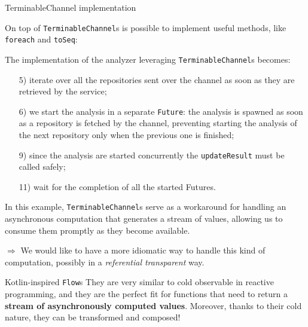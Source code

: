 \documentclass[aspectratio=1610,xcolor=dvipsnames]{beamer}
\begin{document}
%
\begin{frame}{TerminableChannel implementation}
  
\end{frame}
%
\begin{frame}
  
\end{frame}
%
\begin{frame}
  \small
  On top of \texttt{TerminableChannel}s is possible to implement useful methods, like \texttt{foreach} and \texttt{toSeq}:
  
\end{frame}
%
\begin{frame}
  \small
  The implementation of the analyzer leveraging \texttt{TerminableChannel}s becomes:
  
  \footnotesize
  \begin{enumerate}
      \item[5)] iterate over all the repositories sent over the channel as soon as they are retrieved by the service;
      \item[6)] we start the analysis in a separate \texttt{Future}: the analysis is spawned as soon as a repository is fetched by the channel, preventing starting the analysis of the next repository only when the previous one is finished;
      \item[9)] since the analysis are started concurrently the \texttt{updateResult} must be called safely;
      \item[11)] wait for the completion of all the started Futures.
  \end{enumerate}
\end{frame}
%
\begin{frame}
  In this example, \texttt{TerminableChannel}s serve as a workaround for handling an asynchronous computation that generates a stream of values, allowing us to consume them promptly as they become available.
  
  \vspace*{0.5cm}
  $\Rightarrow$ We would like to have a more idiomatic way to handle this kind of computation, possibly in a \textit{referential transparent} way.

  \begin{block}{Kotlin-inspired \texttt{Flow}s}
    They are very similar to cold observable in reactive programming, and they are the perfect fit for functions that need to return a \textbf{stream of asynchronously computed values}. Moreover, thanks to their cold nature, they can be transformed and composed!
  \end{block}
\end{frame}
\end{document}
